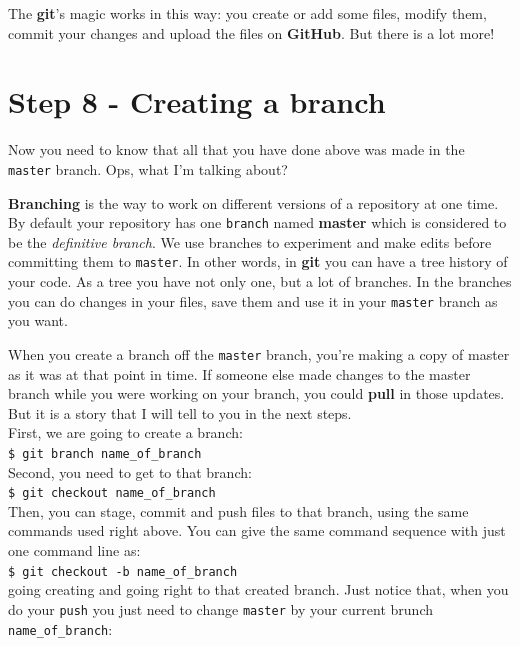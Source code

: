 \documentclass[12pt,a4paper,titlepage,brazil]{article}
\begin{document}
{The {\bf git}'s magic works in this way: you create or add some files, modify them, commit your changes and upload the files on {\bf GitHub}. But there is a lot more!


\section{Step 8 - Creating a branch}

Now you need to know that all that you have done above was made in the \texttt{master} branch. Ops, what I'm talking about?

{\bf Branching} is the way to work on different versions of a repository at one time. By default your repository has one \texttt{branch} named {\bf master} which is considered to be the {\em definitive branch}. We use branches to experiment and make edits before committing them to \texttt{master}. In other words, in {\bf git} you can have a tree history of your code. As a tree you have not only one, but a lot of branches. In the branches you can do changes in your files, save them and use it in your \texttt{master} branch as you want.

When you create a branch off the \texttt{master} branch, you’re making a copy of master as it was at that point in time. If someone else made changes to the master branch while you were working on your branch, you could {\bf pull} in those updates. But it is a story that I will tell to you in the next steps.\\

First, we are going to create a branch:\\

\texttt{\$ git branch name\_of\_branch}\\

Second, you need to get to that branch:\\

\texttt{\$ git checkout name\_of\_branch}\\

Then, you can stage, commit and push files to that branch, using the same commands used right above. You can give the same command sequence with just one command line as:\\

\texttt{\$ git checkout -b name\_of\_branch}\\

going creating and going right to that created branch. Just notice that, when you do your \texttt{push} you just need to change \texttt{master} by your current brunch \texttt{name\_of\_branch}:\\

}
\end{document}

